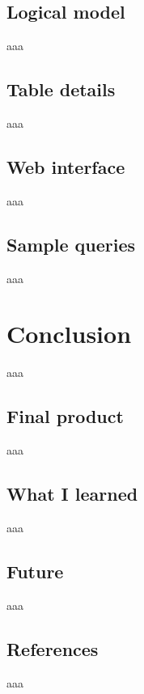 \documentclass[12pt]{report}
\begin{document}
        \chapter{Logical model}
            aaa

        \chapter{Table details} 
            aaa

        \chapter{Web interface}
            aaa
            
        \chapter{Sample queries}
            aaa

    \part{Conclusion}
        aaa

        \chapter{Final product}
            aaa

        \chapter{What I learned}
            aaa

        \chapter{Future}
            aaa

        \chapter{References}
            aaa
\end{document}
